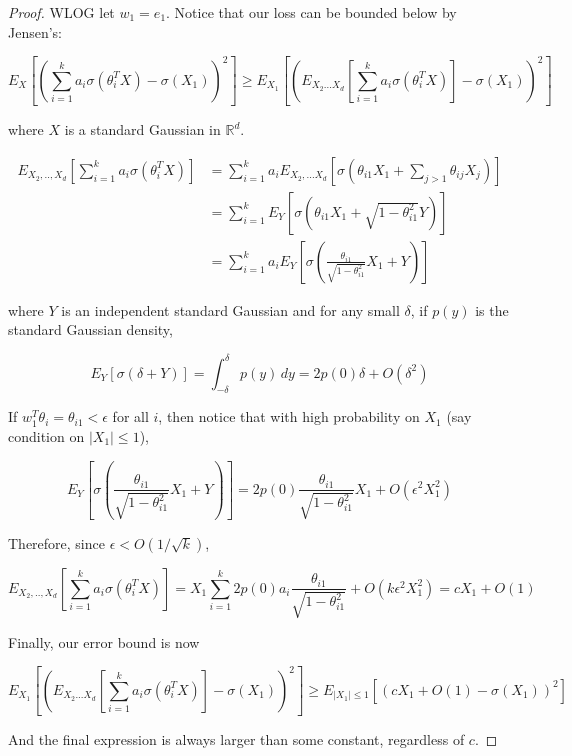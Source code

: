 \documentclass[11pt]{article}
\newcommand{\R}{{\mathbb{R}}}
\begin{document}
\begin{proof}
WLOG let $w_1 = e_1$. Notice that our loss can be bounded below by Jensen's:

\[E_X \left[ \left( \sum_{i=1}^k a_i \sigma(\theta_i^TX) - \sigma(X_1)\right)^2 \right] \geq E_{X_1} \left[ \left( E_{X_2...X_d}\left[ \sum_{i=1}^k a_i \sigma(\theta_i^TX) \right]- \sigma(X_1)\right)^2 \right]
\]

where $X$ is a standard Gaussian in $\R^d$. 

\begin{align*}
E_{X_2,..,X_d} \left[  \sum_{i=1}^k a_i \sigma(\theta_i^TX) \right] &= \sum_{i=1}^k a_i E_{X_2,...X_d}\left[  \sigma(\theta_{i1}X_1 + \sum_{j >1} \theta_{ij}X_{j})  \right]\\
&= \sum_{i=1}^k E_{Y} \left[   \sigma(\theta_{i1}X_1 + \sqrt{1-\theta_{i1}^2}Y)  \right]  \\
&= \sum_{i=1}^k a_i E_{Y} \left[   \sigma(\textstyle\frac{\theta_{i1}}{\sqrt{1-\theta_{i1}^2}}X_1 + Y)  \right] 
\end{align*}

where $Y$ is an independent standard Gaussian and for any small $\delta$, if $p(y)$ is the standard Gaussian density, 

\[ E_Y[\sigma(\delta + Y)] = \int_{-\delta}^{\delta} p(y) \, dy = 2p(0)\delta + O(\delta^2) \]

If $w_1^T\theta_i = \theta_{i1} < \epsilon$ for all $i$, then notice that with high probability on $X_1$ (say condition on $|X_1| \leq 1$), 

\[E_{Y} \left[   \sigma(\textstyle\frac{\theta_{i1}}{\sqrt{1-\theta_{i1}^2}}X_1 + Y)  \right] = 2p(0)\textstyle\frac{\theta_{i1}}{\sqrt{1-\theta_{i1}^2}}X_1 + O(\epsilon^2X_1^2)\]

Therefore, since $\epsilon < O(1/\sqrt{k})$,

\[E_{X_2,..,X_d} \left[  \sum_{i=1}^k a_i \sigma(\theta_i^TX) \right]  = X_1 \sum_{i=1}^k2p(0)a_i\textstyle\frac{\theta_{i1}}{\sqrt{1-\theta_{i1}^2}} + O(k\epsilon^2X_1^2) = cX_1+O(1)\] 


Finally, our error bound is now

\[E_{X_1} \left[ \left( E_{X_2...X_d}\left[ \sum_{i=1}^k a_i \sigma(\theta_i^TX) \right]- \sigma(X_1)\right)^2 \right] \geq E_{|X_1| \leq 1}[(cX_1+O(1) - \sigma(X_1))^2]\]

And the final expression is always larger than some constant, regardless of $c$.
\end{proof}
\end{document}
